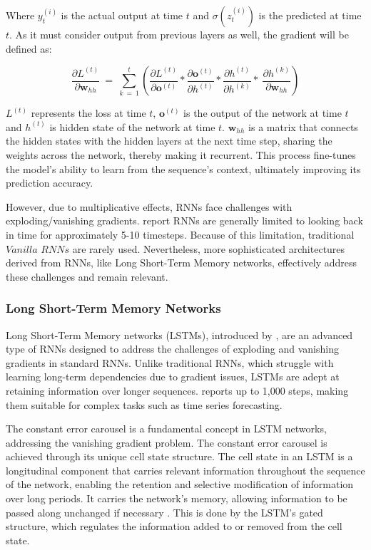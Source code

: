 \documentclass[12pt,a4paper]{article}
\begin{document}
Where $y_t^{\left(i\right)}$ is the actual output at time $t$ and  $\sigma\left(z_t^{\left(i\right)}\right)$ is the predicted at time $t$. As it must consider output from previous layers as well, the gradient will be defined as:

\begin{equation}
  \frac{\partial L^{\left(t\right)}}{\partial\textbf{w}_{hh}}\ =\ \sum_{k\ =\ 1}^{t}\left(\frac{\partial L^{\left(t\right)}}{\partial\textbf{o}^{\left(t\right)}}\ast\frac{\partial\textbf{o}^{\left(t\right)}}{\partial h^{\left(t\right)}}\ast\frac{\partial h^{\left(t\right)}}{\partial h^{\left(k\right)}}\ast\ \frac{\partial h^{\left(k\right)}}{\partial\textbf{w}_{hh}}\right)
  \label{rnngradient}
\end{equation}

$L^{\left(t\right)}$ represents the loss at time $t$, $\textbf{o}^{\left(t\right)}$ is the output of the network at time $t$ and $h^{\left(t\right)}$ is hidden state of the network at time $t$. $\textbf{w}_{hh}$ is a matrix that connects the hidden states with the hidden layers at the next time step, sharing the weights across the network, thereby making it recurrent. This process fine-tunes the model's ability to learn from the sequence's context, ultimately improving its prediction accuracy.

However, due to multiplicative effects, RNNs face challenges with exploding/vanishing gradients. \cite{Gers2000} report RNNs are generally limited to looking back in time for approximately 5-10 timesteps. Because of this limitation, traditional $Vanilla$ $RNNs$ are rarely used. Nevertheless, more sophisticated architectures derived from RNNs, like Long Short-Term Memory networks, effectively address these challenges and remain relevant.

\subsubsection{Long Short-Term Memory Networks}
Long Short-Term Memory networks (LSTMs), introduced by \cite{Hochreiter1997}, are an advanced type of RNNs designed to address the challenges of exploding and vanishing gradients in standard RNNs. Unlike traditional RNNs, which struggle with learning long-term dependencies due to gradient issues, LSTMs are adept at retaining information over longer sequences. \cite{Staudemeyer2019} reports up to 1,000 steps, making them suitable for complex tasks such as time series forecasting.

The constant error carousel is a fundamental concept in LSTM networks, addressing the vanishing gradient problem. The constant error carousel is achieved through its unique cell state structure. The cell state in an LSTM is a longitudinal component that carries relevant information throughout the sequence of the network, enabling the retention and selective modification of information over long periods. It carries the network's memory, allowing information to be passed along unchanged if necessary \parencite{Staudemeyer2019}. This is done by the LSTM's gated structure, which regulates the information added to or removed from the cell state.
\end{document}
